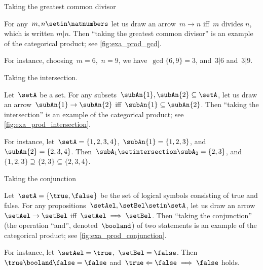 \begin{marginfigure}
    \centering
    \caption{Taking the greatest common divisor}
    \label{fig:exa_prod_gcd}
\end{marginfigure}

\begin{example}
    \label{exa:gcd-as-prod}
    For any~$m, n \setin \natnumbers$ let us draw an arrow~$m \to n$ iff~$m$ divides $n$, which is written $m | n$.
    Then ``taking the greatest common divisor'' is an example of the categorical product; see \cref{fig:exa_prod_gcd}.

    For instance, choosing~$m = 6$,~$n = 9$, we have~$\gcd \{6, 9 \} = 3$, and~$3 | 6$ and~$3 | 9$.
\end{example}

\begin{marginfigure}
    \centering
    \caption{Taking the intersection.}
    \label{fig:exa_prod_intersection}
\end{marginfigure}

\begin{example}
    \label{exa:intersection-as-prod}
    Let~$\setA$ be a set.
    For any subsets~$\subAn{1}, \subAn{2} \subseteq \setA$, let us draw an arrow~$\subAn{1} \to \subAn{2}$ iff~$\subAn{1} \subseteq \subAn{2}$.
    Then ``taking the intersection'' is an example of the categorical product; see \cref{fig:exa_prod_intersection}.

    For instance, let~$\setA = \{ 1, 2, 3, 4 \}$,~$\subAn{1} = \{ 1, 2, 3 \}$, and~$\subAn{2} = \{2, 3, 4 \}$.
    Then~$\subA_1 \setintersection \subA_2 = \{2, 3 \}$, and~$\{ 1, 2, 3 \} \supseteq \{2, 3 \} \subseteq \{2, 3, 4 \}$.
\end{example}

\begin{marginfigure}
    \centering
    \caption{Taking the conjunction}
    \label{fig:exa_prod_conjunction}
\end{marginfigure}

\begin{example}
    \label{exa:conjunction-as-prod}
    Let~$\setA = \{ \true, \false \}$ be the set of logical symbols consisting of true and false.
    For any propositions~$\setAel, \setBel  \setin \setA$, let us draw an arrow~$\setAel \to \setBel$ iff~$\setAel \implies \setBel$.
    Then ``taking the conjunction'' (the operation ``and'', denoted~$\booland$) of two statements is an example of the categorical product; see \cref{fig:exa_prod_conjunction}.

    For instance, let~$\setAel = \true$,~$\setBel = \false$.
    Then~$\true \booland \false = \false$ and~$\true \Leftarrow \false \implies \false$ holds.
\end{example}

